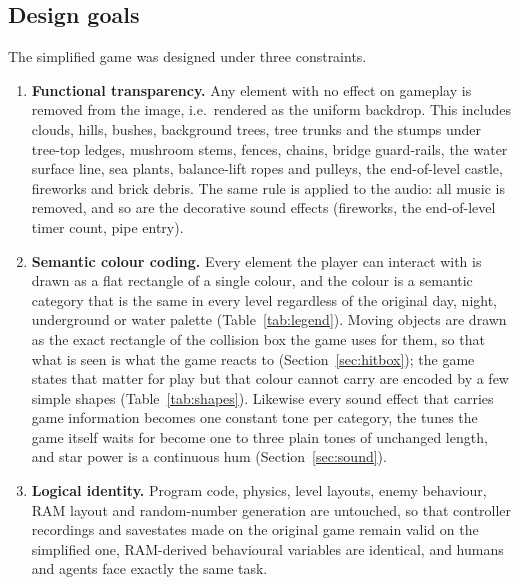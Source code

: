 \documentclass{article}
\begin{document}
\subsection{Design goals}
\label{sec:goals}

The simplified game was designed under three constraints.
\begin{enumerate}
  \item \textbf{Functional transparency.} Any element with no effect on gameplay is removed from
  the image, i.e.\ rendered as the uniform backdrop. This includes clouds, hills, bushes,
  background trees, tree trunks and the stumps under tree-top ledges, mushroom stems, fences,
  chains, bridge guard-rails, the water surface line, sea plants, balance-lift ropes and pulleys,
  the end-of-level castle, fireworks and brick debris. The same rule is applied to the audio: all
  music is removed, and so are the decorative sound effects (fireworks, the end-of-level timer
  count, pipe entry).
  \item \textbf{Semantic colour coding.} Every element the player can interact with is drawn as
  a flat rectangle of a single colour, and the colour is a semantic category that is the same in
  every level regardless of the original day, night, underground or water palette
  (Table~\ref{tab:legend}). Moving objects are drawn as the exact rectangle of the collision box
  the game uses for them, so that what is seen is what the game reacts to
  (Section~\ref{sec:hitbox}); the game states that matter for play but that colour cannot carry
  are encoded by a few simple shapes (Table~\ref{tab:shapes}). Likewise every sound effect that
  carries game information becomes one constant tone per category, the tunes the game itself waits
  for become one to three plain tones of unchanged length, and star power is a continuous hum
  (Section~\ref{sec:sound}).
  \item \textbf{Logical identity.} Program code, physics, level layouts, enemy behaviour, RAM
  layout and random-number generation are untouched, so that controller recordings and savestates
  made on the original game remain valid on the simplified one, RAM-derived behavioural variables
  are identical, and humans and agents face exactly the same task.
\end{enumerate}
\end{document}
